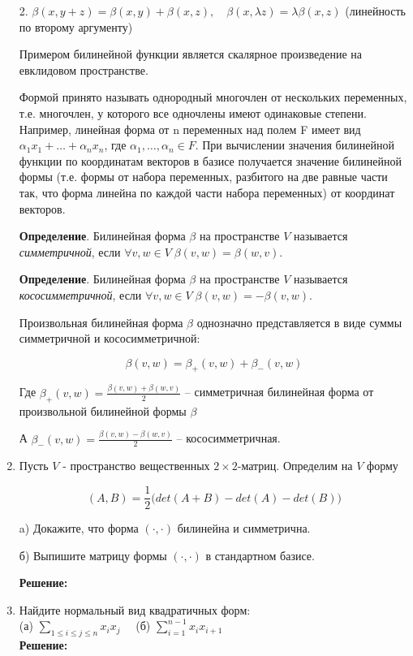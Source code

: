 \documentclass[]{book}
\theoremstyle{definition}
\renewcommand{\leq}{\leqslant}
\begin{document}
\begin{enumerate}[resume]
2. $\beta(x, y + z) = \beta(x, y) + \beta(x, z), \quad \beta(x, \lambda z) = \lambda \beta(x,z)$ (линейность по второму аргументу)

Примером билинейной функции является скалярное произведение на евклидовом пространстве.

Формой принято называть однородный многочлен от нескольких переменных, т.е. многочлен, у которого все одночлены имеют одинаковые степени. Например, линейная форма от n переменных над полем F имеет вид $\alpha_1x_1 + \ldots + \alpha_nx_n$, где $\alpha_1, \ldots , \alpha_n \in F$. При вычислении значения билинейной функции по координатам векторов в базисе получается значение билинейной формы (т.е. формы от набора переменных, разбитого на две равные части так, что форма линейна по каждой части набора переменных) от координат векторов.

\textbf{Определение}. 
Билинейная форма $\beta$ на пространстве $V$ называется \textit{симметричной}, если $\forall v, w \in V \; \beta(v, w) = \beta(w, v)$.

\textbf{Определение}.
Билинейная форма $\beta$ на пространстве $V$ называется \textit{кососимметричной}, если $\forall v, w \in V \; \beta(v, w) = -\beta(v, w)$.

Произвольная билинейная форма $\beta$ однозначно представляется в виде суммы симметричной и кососимметричной:

$$\beta(v,w) = \beta_{+}(v, w) + \beta_{-}(v,w)$$

Где $\beta_{+}(v,w) = \frac{ \beta(v, w) + \beta(w, v) }{2}$ -- симметричная билинейная форма от произвольной билинейной формы $\beta$

А $\beta_{-}(v,w) = \frac{ \beta(v, w) - \beta(w, v) }{2}$ -- кососимметричная.


\item Пусть $V$ - пространство вещественных $2\times2$-матриц. Определим на $V$ форму

$$(A,B)=\frac{1}{2}\Big(det(A+B)-det(A)-det(B)\Big)$$

a) Докажите, что форма $(\cdot,\cdot)$ билинейна и симметрична.

б) Выпишите матрицу формы $(\cdot,\cdot)$ в стандартном базисе.

\textbf{Решение:}


\item Найдите нормальный вид квадратичных форм:\\
(а) ${\sum}_{1\leq i\leq j\leq n} x_i x_j$ \ \ (б) ${\sum}_{i=1}^{n-1} x_i x_{i+1}$\\
\textbf{Решение:}\\



\end{enumerate}
\end{document}

